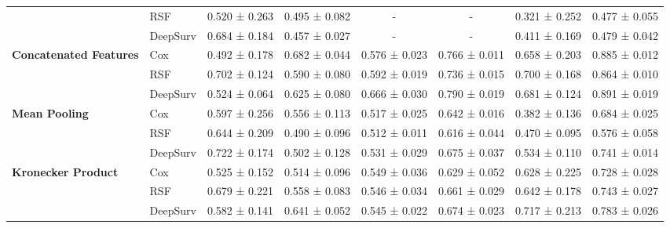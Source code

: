 \begin{sidewaystable}[htbp]
\begin{tabular}{@{}llcccccc@{}}
        & RSF & 0.520 ± 0.263 & 0.495 ± 0.082 & - & - & 0.321 ± 0.252 & 0.477 ± 0.055 \\
        & DeepSurv & 0.684 ± 0.184 & 0.457 ± 0.027 & - & - & 0.411 ± 0.169 & 0.479 ± 0.042 \\
        \midrule
        \multirow{3}{*}{\textbf{Concatenated Features}} & Cox & 0.492 ± 0.178 & 0.682 ± 0.044 & 0.576 ± 0.023 & 0.766 ± 0.011 & 0.658 ± 0.203 & 0.885 ± 0.012 \\
        & RSF & 0.702 ± 0.124 & 0.590 ± 0.080 & 0.592 ± 0.019 & 0.736 ± 0.015 & 0.700 ± 0.168 & 0.864 ± 0.010 \\
        & DeepSurv & 0.524 ± 0.064 & 0.625 ± 0.080 & 0.666 ± 0.030 & 0.790 ± 0.019 & 0.681 ± 0.124 & 0.891 ± 0.019 \\
        \midrule
        \multirow{3}{*}{\textbf{Mean Pooling}} & Cox & 0.597 ± 0.256 & 0.556 ± 0.113 & 0.517 ± 0.025 & 0.642 ± 0.016 & 0.382 ± 0.136 & 0.684 ± 0.025 \\
        & RSF & 0.644 ± 0.209 & 0.490 ± 0.096 & 0.512 ± 0.011 & 0.616 ± 0.044 & 0.470 ± 0.095 & 0.576 ± 0.058 \\
        & DeepSurv & 0.722 ± 0.174 & 0.502 ± 0.128 & 0.531 ± 0.029 & 0.675 ± 0.037 & 0.534 ± 0.110 & 0.741 ± 0.014 \\
        \midrule
        \multirow{3}{*}{\textbf{Kronecker Product}} & Cox & 0.525 ± 0.152 & 0.514 ± 0.096 & 0.549 ± 0.036 & 0.629 ± 0.052 & 0.628 ± 0.225 & 0.728 ± 0.028 \\
        & RSF & 0.679 ± 0.221 & 0.558 ± 0.083 & 0.546 ± 0.034 & 0.661 ± 0.029 & 0.642 ± 0.178 & 0.743 ± 0.027 \\
        & DeepSurv & 0.582 ± 0.141 & 0.641 ± 0.052 & 0.545 ± 0.022 & 0.674 ± 0.023 & 0.717 ± 0.213 & 0.783 ± 0.026 \\
        \bottomrule
    \end{tabular}
\end{sidewaystable}

